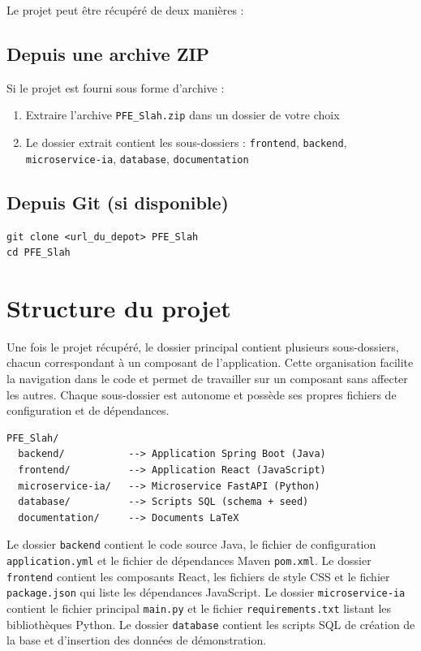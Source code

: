 \documentclass[12pt,a4paper]{report}
\begin{document}
Le projet peut être récupéré de deux manières :

\subsection{Depuis une archive ZIP}

Si le projet est fourni sous forme d'archive :
\begin{enumerate}
    \item Extraire l'archive \texttt{PFE\_Slah.zip} dans un dossier de votre choix
    \item Le dossier extrait contient les sous-dossiers : \texttt{frontend}, \texttt{backend}, \texttt{microservice-ia}, \texttt{database}, \texttt{documentation}
\end{enumerate}

\subsection{Depuis Git (si disponible)}

\begin{verbatim}
git clone <url_du_depot> PFE_Slah
cd PFE_Slah
\end{verbatim}

\section{Structure du projet}

Une fois le projet récupéré, le dossier principal contient plusieurs sous-dossiers, chacun correspondant à un composant de l'application. Cette organisation facilite la navigation dans le code et permet de travailler sur un composant sans affecter les autres. Chaque sous-dossier est autonome et possède ses propres fichiers de configuration et de dépendances.

\begin{verbatim}
PFE_Slah/
  backend/           --> Application Spring Boot (Java)
  frontend/          --> Application React (JavaScript)
  microservice-ia/   --> Microservice FastAPI (Python)
  database/          --> Scripts SQL (schema + seed)
  documentation/     --> Documents LaTeX
\end{verbatim}

Le dossier \texttt{backend} contient le code source Java, le fichier de configuration \texttt{application.yml} et le fichier de dépendances Maven \texttt{pom.xml}. Le dossier \texttt{frontend} contient les composants React, les fichiers de style CSS et le fichier \texttt{package.json} qui liste les dépendances JavaScript. Le dossier \texttt{microservice-ia} contient le fichier principal \texttt{main.py} et le fichier \texttt{requirements.txt} listant les bibliothèques Python. Le dossier \texttt{database} contient les scripts SQL de création de la base et d'insertion des données de démonstration.
\end{document}
